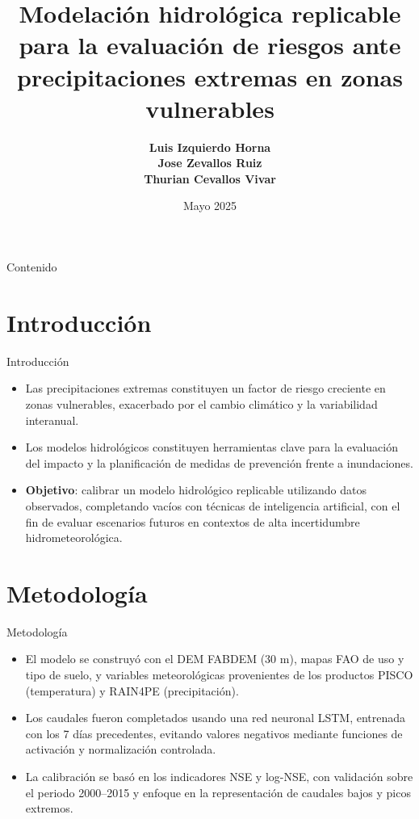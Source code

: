 \documentclass{beamer}
\title[\,]{Modelación hidrológica replicable para la evaluación de riesgos ante precipitaciones extremas en zonas vulnerables}
\author{
  \textbf{Luis Izquierdo Horna} \\
  \textbf{Jose Zevallos Ruiz} \\
  \textbf{Thurian Cevallos Vivar}
}
\institute{Universidad Tecnológica del Perú (UTP)}
\date{Mayo 2025}
\begin{document}
\begin{frame}
  \titlepage
\end{frame}

\begin{frame}{Contenido}
  \tableofcontents
\end{frame}

\section{Introducción}
\begin{frame}{Introducción}
  \small
  \begin{itemize}
    \item Las precipitaciones extremas constituyen un factor de riesgo creciente en zonas vulnerables, exacerbado por el cambio climático y la variabilidad interanual.
    \item Los modelos hidrológicos constituyen herramientas clave para la evaluación del impacto y la planificación de medidas de prevención frente a inundaciones.
    \item \textbf{Objetivo}: calibrar un modelo hidrológico replicable utilizando datos observados, completando vacíos con técnicas de inteligencia artificial, con el fin de evaluar escenarios futuros en contextos de alta incertidumbre hidrometeorológica.
  \end{itemize}
\end{frame}

\section{Metodología}
\begin{frame}{Metodología}
  \small
  \begin{itemize}
    \item El modelo se construyó con el DEM FABDEM (30 m), mapas FAO de uso y tipo de suelo, y variables meteorológicas provenientes de los productos PISCO (temperatura) y RAIN4PE (precipitación).
    \item Los caudales fueron completados usando una red neuronal LSTM, entrenada con los 7 días precedentes, evitando valores negativos mediante funciones de activación y normalización controlada.
    \item La calibración se basó en los indicadores NSE y log-NSE, con validación sobre el periodo 2000–2015 y enfoque en la representación de caudales bajos y picos extremos.
  \end{itemize}
\end{frame}
\end{document}
